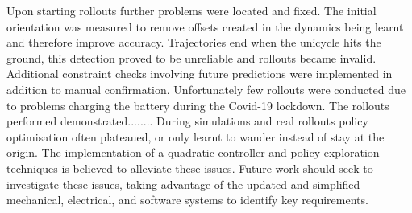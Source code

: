 \documentclass[twoside,twocolumn,12pt]{article}
\begin{document}
\newline
\newline
Upon starting rollouts further problems were located and fixed. The initial orientation was measured to remove offsets created in the dynamics being learnt and therefore improve accuracy. Trajectories end when the unicycle hits the ground, this detection proved to be unreliable and rollouts became invalid. Additional constraint checks involving future predictions were implemented in addition to manual confirmation.
\newline
\newline
Unfortunately few rollouts were conducted due to problems charging the battery during the Covid-19 lockdown. The rollouts performed demonstrated........
\newline
\newline
During simulations and real rollouts policy optimisation often plateaued, or only learnt to wander instead of stay at the origin. The implementation of a quadratic controller and policy exploration techniques is believed to alleviate these issues.
\newline
\newline
Future work should seek to investigate these issues, taking advantage of the updated and simplified mechanical, electrical, and software systems to identify key requirements. 

\onecolumn

\tableofcontents

\twocolumn
\end{document}
